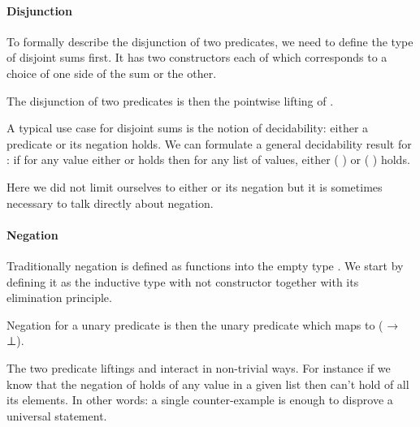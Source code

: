 \paragraph{Disjunction} To formally describe the disjunction of two predicates,
we need to define  the type of disjoint sums first. It has two
constructors each of which corresponds to a choice of one side of the sum or
the other.


The disjunction of two predicates is then the pointwise lifting of .


A typical use case for disjoint sums is the notion of decidability: either
a predicate or its negation holds. We can formulate a general decidability
result for : if for any value either  or  holds then for
any list of values, either {( )} or {( )} holds.


Here we did not limit ourselves to either  or its negation but it is
sometimes necessary to talk directly about negation.

\paragraph{Negation} Traditionally negation is defined as functions into
the empty type . We start by defining it as the inductive type with
not constructor together with its elimination principle.

\begin{minipage}[t]{0.225\textwidth}
\end{minipage}\begin{minipage}[t]{0.225\textwidth}
\end{minipage}

Negation for a unary predicate  is then the unary predicate which maps
 to {(  → ⊥)}.


The two predicate liftings  and  interact in non-trivial ways.
For instance if we know that the negation of  holds of any value in a
given list then  can't hold of all its elements. In other words: a
single counter-example is enough to disprove a universal statement.

